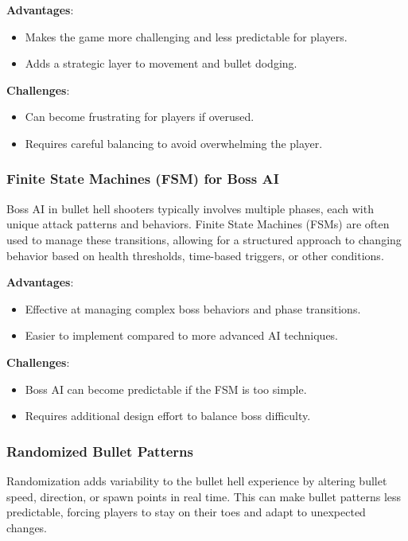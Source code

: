 \textbf{Advantages}:
\begin{itemize}
    \item Makes the game more challenging and less predictable for players.
    \item Adds a strategic layer to movement and bullet dodging.
\end{itemize}

\textbf{Challenges}:
\begin{itemize}
    \item Can become frustrating for players if overused.
    \item Requires careful balancing to avoid overwhelming the player.
\end{itemize}

\subsubsection{Finite State Machines (FSM) for Boss AI}

Boss AI in bullet hell shooters typically involves multiple phases, each with unique attack patterns and behaviors. Finite State Machines (FSMs) are often used to manage these transitions, allowing for a structured approach to changing behavior based on health thresholds, time-based triggers, or other conditions.

\textbf{Advantages}:
\begin{itemize}
    \item Effective at managing complex boss behaviors and phase transitions.
    \item Easier to implement compared to more advanced AI techniques.
\end{itemize}

\textbf{Challenges}:
\begin{itemize}
    \item Boss AI can become predictable if the FSM is too simple.
    \item Requires additional design effort to balance boss difficulty.
\end{itemize}

\subsubsection{Randomized Bullet Patterns}

Randomization adds variability to the bullet hell experience by altering bullet speed, direction, or spawn points in real time. This can make bullet patterns less predictable, forcing players to stay on their toes and adapt to unexpected changes.


